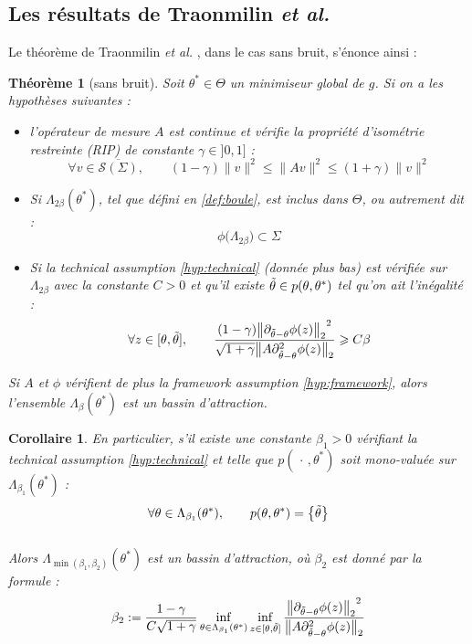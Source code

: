 \documentclass[hidelinks, french]{article} %
\renewcommand{\leq}{\leqslant}
\renewcommand{\geq}{\geqslant}
\newcommand{\etal}{\textit{et al. }}
\theoremstyle{enonce}
\newtheorem{theoreme}{Théorème}
\newtheorem{corollaire}{\qquad Corollaire}[theoreme]
\theoremstyle{special}
\theoremstyle{rq}
\theoremstyle{exo}
\theoremstyle{demo}
\begin{document}
\subsection{Les résultats de Traonmilin {\itshape et al.}}\label{sec:article2/2}

Le théorème de Traonmilin \etal, dans le cas sans bruit, s'énonce ainsi :
\\
\begin{theoreme}[sans bruit]\label{theo:maintheo} Soit $\theta^*\in\Theta$ un minimiseur global de $g$. Si on a les hypothèses suivantes :
	\begin{itemize}
		\item l'opérateur de mesure $A$ est continue et vérifie la \emph{propriété d'isométrie restreinte} (RIP) de constante $\gamma\in]0,1]$ :
		\begin{equation}\label{eq:RIP}
			\forall v\in\overline{\mathcal{S}(\Sigma)},\qquad (1-\gamma)\|v\|^2\leq \|Av\|^2\leq (1+\gamma)\|v\|^2
		\end{equation}
		
		\item Si $\Lambda_{2\beta}(\theta^*)$, tel que défini en \ref{def:boule}, est inclus dans $\Theta$, ou autrement dit :
		\begin{equation}\label{eq:LambinTheta}
			\phi\big(\Lambda_{2\beta}\big)\subset\Sigma
		\end{equation}
		
		\item Si la \emph{technical assumption} \ref{hyp:technical} (donnée plus bas) est vérifiée sur $\Lambda_{2\beta}$ avec la constante $C>0$ et qu'il existe $\Tilde{\theta}\in p(\theta,\theta^*)$ tel qu'on ait l'inégalité :
		\begin{equation}\label{eq:majo3}
			\forall z\in[\theta,\Tilde{\theta}],\qquad \frac{(1-\gamma){\big\|\partial_{\Tilde{\theta}-\theta}\phi(z)\big\|_2}^2}{\sqrt{1+\gamma}\big\|A\partial^2_{\Tilde{\theta}-\theta}\phi(z)\big\|_2}\geq C\beta
		\end{equation}
	\end{itemize}
	
	Si $A$ et $\phi$ vérifient de plus la \emph{framework assumption} \ref{hyp:framework}, alors l'ensemble $\Lambda_\beta(\theta^*)$ est un bassin d'attraction.  
\end{theoreme}

\begin{corollaire}
	En particulier, s'il existe une constante $\beta_1>0$ vérifiant la \emph{technical assumption} \ref{hyp:technical} et telle que $p(\,\cdot\,, \theta^*)$ soit mono-valuée sur $\Lambda_{\beta_1}(\theta^*)$ :
	\[\forall \theta\in\Lambda_{\beta_1}(\theta^*),\qquad p(\theta,\theta^*)=\big\{\Tilde{\theta}\big\}\]
	\\
	Alors $\Lambda_{\min(\beta_1,\beta_2)}(\theta^*)$ est un bassin d'attraction, où $\beta_2$ est donné par la formule :
	\[\beta_2:=\frac{1-\gamma}{C\sqrt{1+\gamma}}\inf_{\theta\in\Lambda_{\beta_1}(\theta^*)}\inf_{z\in[\theta,\Tilde{\theta}]}\frac{{\big\|\partial_{\Tilde{\theta}-\theta}\phi(z)\big\|_2}^2}{\big\|A\partial^2_{\Tilde{\theta}-\theta}\phi(z)\big\|_2}\]
\end{corollaire}
\end{document}

